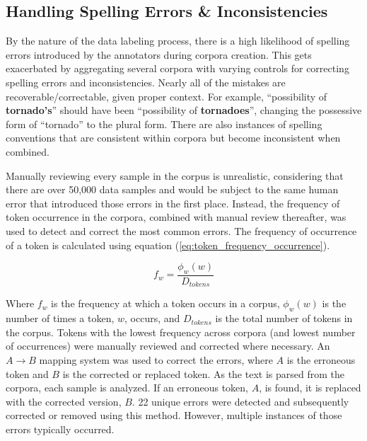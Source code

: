 \documentclass[12pt]{article}
\begin{document}
\subsection{Handling Spelling Errors \& Inconsistencies}\label{sec:spelling_errors}
By the nature of the data labeling process, there is a high likelihood of spelling errors introduced by the annotators during corpora creation. This gets exacerbated by aggregating several corpora with varying controls for correcting spelling errors and inconsistencies. Nearly all of the mistakes are recoverable/correctable, given proper context. For example, ``possibility of \textbf{tornado's}'' should have been ``possibility of \textbf{tornadoes}'', changing the possessive form of ``tornado'' to the plural form. There are also instances of spelling conventions that are consistent within corpora but become inconsistent when combined.

Manually reviewing every sample in the corpus is unrealistic, considering that there are over 50,000 data samples and would be subject to the same human error that introduced those errors in the first place. Instead, the frequency of token occurrence in the corpora, combined with manual review thereafter, was used to detect and correct the most common errors. The frequency of occurrence of a token is calculated using equation (\ref{eq:token_frequency_occurrence}).

\begin{equation}\label{eq:token_frequency_occurrence}
    f_w = \frac{\phi_w(w)}{D_{tokens}}
\end{equation}

\noindent
Where $f_w$ is the frequency at which a token occurs in a corpus, $\phi_w(w)$ is the number of times a token, $w$, occurs, and $D_{tokens}$ is the total number of tokens in the corpus. Tokens with the lowest frequency across corpora (and lowest number of occurrences) were manually reviewed and corrected where necessary. An $A \rightarrow B$ mapping system was used to correct the errors, where \(A\) is the erroneous token and \(B\) is the corrected or replaced token. As the text is parsed from the corpora, each sample is analyzed. If an erroneous token, $A$, is found, it is replaced with the corrected version, $B$. 22 unique errors were detected and subsequently corrected or removed using this method. However, multiple instances of those errors typically occurred.
\end{document}
